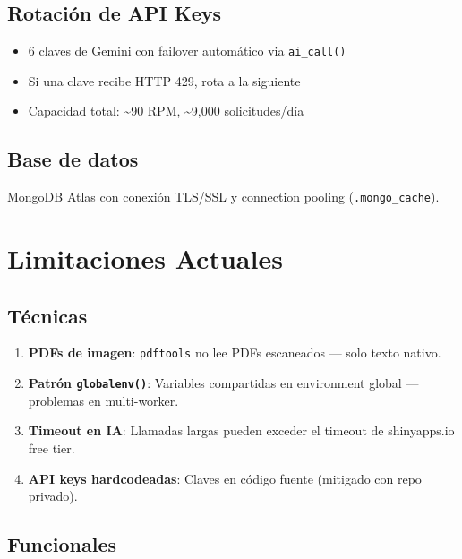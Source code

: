 \documentclass[
  spanish,
  11pt,
  a4paper,
]{article}
\providecommand{\tightlist}{%
  \setlength{\itemsep}{0pt}\setlength{\parskip}{0pt}}
\begin{document}
\subsection{Rotación de API Keys}\label{rotaciuxf3n-de-api-keys}

\begin{itemize}
\tightlist
\item
  6 claves de Gemini con failover automático via \texttt{ai\_call()}
\item
  Si una clave recibe HTTP 429, rota a la siguiente
\item
  Capacidad total: \textasciitilde90 RPM, \textasciitilde9,000
  solicitudes/día
\end{itemize}

\subsection{Base de datos}\label{base-de-datos}

MongoDB Atlas con conexión TLS/SSL y connection pooling
(\texttt{.mongo\_cache}).

\section{Limitaciones Actuales}\label{limitaciones-actuales}

\subsection{Técnicas}\label{tuxe9cnicas}

\begin{enumerate}
\def\labelenumi{\arabic{enumi}.}
\tightlist
\item
  \textbf{PDFs de imagen}: \texttt{pdftools} no lee PDFs escaneados ---
  solo texto nativo.
\item
  \textbf{Patrón \texttt{globalenv()}}: Variables compartidas en
  environment global --- problemas en multi-worker.
\item
  \textbf{Timeout en IA}: Llamadas largas pueden exceder el timeout de
  shinyapps.io free tier.
\item
  \textbf{API keys hardcodeadas}: Claves en código fuente (mitigado con
  repo privado).
\end{enumerate}

\subsection{Funcionales}\label{funcionales}
\end{document}
